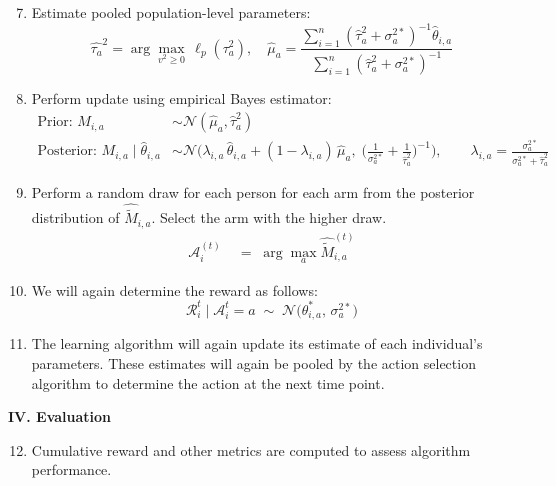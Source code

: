 \documentclass[letterpaper, 11pt]{extarticle}
\begin{document}
\begin{enumerate}
    \setcounter{enumi}{6}
    \item Estimate pooled population-level parameters: 
    $$\hat{\tau_a}^{2} = \arg\max_{v^{2} \ge 0} \, \ell_{p}(\tau_a^{2}), \quad \hat{\mu}_{a} = \frac{\displaystyle\sum_{i=1}^{n} \left(\hat{\tau}_{a}^{2} + \sigma_a^{2*}\right)^{-1} \hat{\theta}_{i,a}}
    {\displaystyle\sum_{i=1}^{n} \left(\hat{\tau}_{a}^{2} + \sigma_a^{2*}\right)^{-1}}$$
    \item Perform update using empirical Bayes estimator:  
    \begin{align*}
    \textrm{Prior: } M_{i,a} &\sim \mathcal{N}(\hat{\mu}_a,\hat{\tau}^2_a)\\
    \textrm{Posterior: }M_{i,a} \mid \hat{\theta}_{i,a}
    &\sim
    \mathcal{N}\!\Bigg(
        \lambda_{i,a}\, \hat{\theta}_{i,a}
        + (1 - \lambda_{i,a})\, \hat{\mu}_a,\;
        \Bigg(
            \frac{1}{\sigma_a^{2*}} 
            + \frac{1}{\hat{\tau}_a^{2}}
        \Bigg)^{-1}
    \Bigg), 
    \qquad
    \lambda_{i,a}
    =
    \frac{\sigma_a^{2*}}
    {\sigma_a^{2*} + \hat{\tau}_a^{2}}
    \end{align*}
    \item Perform a random draw for each person for each arm from the posterior distribution of $\hat{\tilde{M}}_{i,a}$. Select the arm with the higher draw.
    \begin{align*}
        \mathcal A_i^{(t)} &\;=\; \arg\max_{a} \hat{\tilde{M}}_{i,a}^{(t)}
    \end{align*}
    \item We will again determine the reward as follows: $$\mathcal{R}_i^{t} \;\big|\; \mathcal{A}_i^{t} = a \;\sim\; \mathcal{N}\!\big(\theta_{i,a}^*, \, \sigma_{a}^{2*}\big)$$ 
    \item The learning algorithm will again update its estimate of each individual's parameters. These estimates will again be pooled by the action selection algorithm to determine the action at the next time point.
\end{enumerate}
\textsf{\textbf {IV. Evaluation}}
\begin{enumerate}
\setcounter{enumi}{11}
    \item Cumulative reward and other metrics are computed to assess algorithm performance. 
\end{enumerate}
\end{document}
